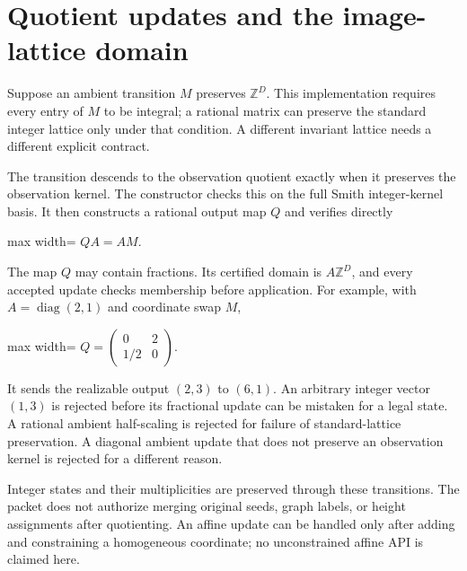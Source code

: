 \documentclass[
  11pt,
  a4paper,
]{report}
\begin{document}
\hypertarget{quotient-updates-and-the-image-lattice-domain}{%
\section{Quotient updates and the image-lattice
domain}\label{quotient-updates-and-the-image-lattice-domain}}

Suppose an ambient transition \(M\) preserves \(\mathbb Z^D\). This
implementation requires every entry of \(M\) to be integral; a rational
matrix can preserve the standard integer lattice only under that
condition. A different invariant lattice needs a different explicit
contract.

The transition descends to the observation quotient exactly when it
preserves the observation kernel. The constructor checks this on the
full Smith integer-kernel basis. It then constructs a rational output
map \(Q\) and verifies directly

\begin{center}
\begin{adjustbox}{max width=\linewidth}
$\displaystyle
 QA=AM.
$
\end{adjustbox}
\end{center}

The map \(Q\) may contain fractions. Its certified domain is
\(A\mathbb Z^D\), and every accepted update checks membership before
application. For example, with \(A=\operatorname{diag}(2,1)\) and
coordinate swap \(M\),

\begin{center}
\begin{adjustbox}{max width=\linewidth}
$\displaystyle
 Q=\begin{pmatrix}0&2\\1/2&0\end{pmatrix}.
$
\end{adjustbox}
\end{center}

It sends the realizable output \((2,3)\) to \((6,1)\). An arbitrary
integer vector \((1,3)\) is rejected before its fractional update can be
mistaken for a legal state. A rational ambient half-scaling is rejected
for failure of standard-lattice preservation. A diagonal ambient update
that does not preserve an observation kernel is rejected for a different
reason.

Integer states and their multiplicities are preserved through these
transitions. The packet does not authorize merging original seeds, graph
labels, or height assignments after quotienting. An affine update can be
handled only after adding and constraining a homogeneous coordinate; no
unconstrained affine API is claimed here.
\end{document}
